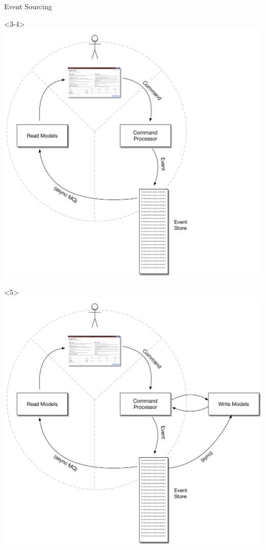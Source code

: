 \begin{frame}[fragile]{Event Sourcing}
\begin{minipage}{.7\textwidth}
\begin{onlyenv}<3-4>
\includegraphics[width=\textwidth]{../EventSourcing3.pdf}
\end{onlyenv}
\begin{onlyenv}<5>
\includegraphics[width=\textwidth]{../EventSourcing4.pdf}

\end{onlyenv}
\end{minipage}
\end{frame}
